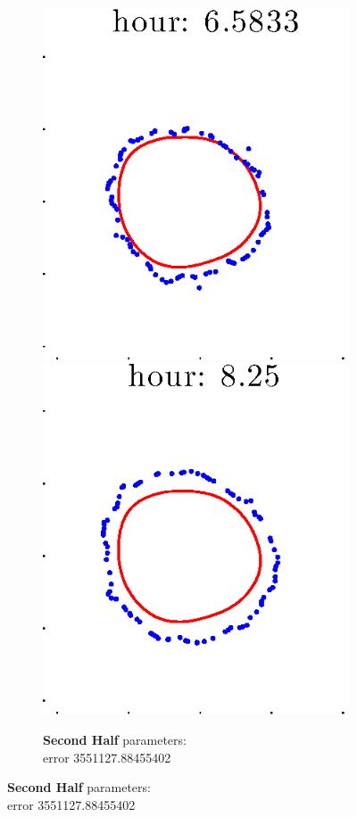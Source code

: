 \documentclass[12pt]{article}
\begin{document}
\begin{figure}[h!]
\begin{subfigure}[b]{.3\textwidth}
		\includegraphics[height=.15\textheight]{Pos5exp2/full/second5.eps}
		\includegraphics[height=.15\textheight]{Pos5exp2/full/second6.eps}
		\caption{\textbf{Second Half} parameters: \\error 3551127.88455402}
	\end{subfigure}
\end{figure}
\end{document}
